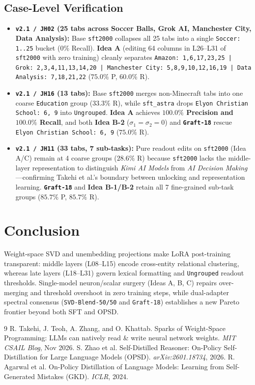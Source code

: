 \documentclass[11pt,a4paper]{article}
\begin{document}
\subsection{Case-Level Verification}
\begin{itemize}
    \item \textbf{\texttt{v2.1 / JH02} (25 tabs across Soccer Balls, Grok AI, Manchester City, Data Analysis):} Base \texttt{sft2000} collapses all 25 tabs into a single \texttt{Soccer: 1..25} bucket ($0\%$ Recall). \textbf{Idea A} (editing 64 columns in L26--L31 of \texttt{sft2000} with zero training) cleanly separates \texttt{Amazon: 1,6,17,23,25 | Grok: 2,3,4,11,13,14,20 | Manchester City: 5,8,9,10,12,16,19 | Data Analysis: 7,18,21,22} ($75.0\%$ P, $60.0\%$ R).
    \item \textbf{\texttt{v2.1 / JH16} (13 tabs):} Base \texttt{sft2000} merges non-Minecraft tabs into one coarse \texttt{Education} group ($33.3\%$ R), while \texttt{sft\_astra} drops \texttt{Elyon Christian School: 6, 9} into \texttt{Ungrouped}. \textbf{Idea A} achieves \textbf{$100.0\%$ Precision and $100.0\%$ Recall}, and both \textbf{Idea B-2} ($\sigma_1=\sigma_2=0$) and \textbf{\texttt{Graft-18}} rescue \texttt{Elyon Christian School: 6, 9} ($75.0\%$ R).
    \item \textbf{\texttt{v2.1 / JH11} (33 tabs, 7 sub-tasks):} Pure readout edits on \texttt{sft2000} (Idea A/C) remain at 4 coarse groups ($28.6\%$ R) because \texttt{sft2000} lacks the middle-layer representation to distinguish \emph{Kimi AI Models} from \emph{AI Decision Making}—confirming Takehi et al.'s boundary between unlocking and representation learning. \textbf{\texttt{Graft-18}} and \textbf{Idea B-1/B-2} retain all 7 fine-grained sub-task groups ($85.7\%$ P, $85.7\%$ R).
\end{itemize}

\section{Conclusion}
Weight-space SVD and unembedding projections make LoRA post-training transparent: middle layers (L08--L15) encode cross-entity relational clustering, whereas late layers (L18--L31) govern lexical formatting and \texttt{Ungrouped} readout thresholds. Single-model neuron/scalar surgery (Ideas A, B, C) repairs over-merging and threshold overshoot in zero training steps, while dual-adapter spectral consensus (\texttt{SVD-Blend-50/50} and \texttt{Graft-18}) establishes a new Pareto frontier beyond both SFT and OPSD.

\begin{thebibliography}{9}
 R. Takehi, J. Teoh, A. Zhang, and O. Khattab. Sparks of Weight-Space Programming: LLMs can natively read \& write neural network weights. \emph{MIT CSAIL Blog}, Nov 2026.
 S. Zhao et al. Self-Distilled Reasoner: On-Policy Self-Distillation for Large Language Models (OPSD). \emph{arXiv:2601.18734}, 2026.
 R. Agarwal et al. On-Policy Distillation of Language Models: Learning from Self-Generated Mistakes (GKD). \emph{ICLR}, 2024.
\end{thebibliography}
\end{document}
